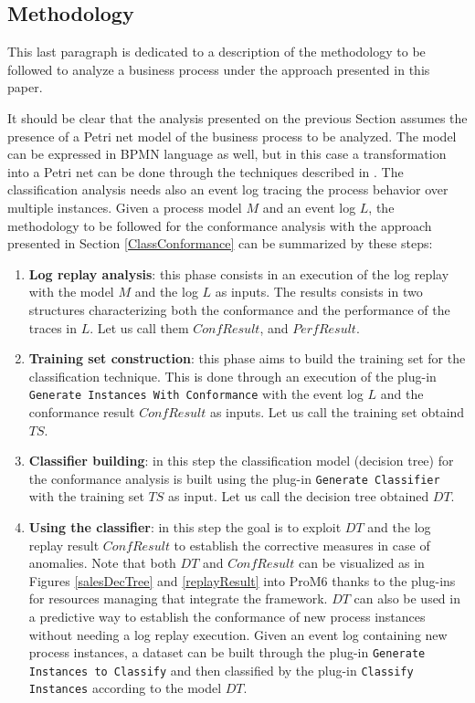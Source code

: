 \documentclass{llncs}
\begin{document}
\subsection{Methodology}
This last paragraph is dedicated to a description of the methodology to be followed to analyze a business process under the approach presented in this paper.

It should be clear that the analysis presented on the previous Section assumes the presence of a Petri net model of the business process to be analyzed. The model can be expressed in BPMN language as well, but in this case a transformation into a Petri net can be done through the techniques described in \cite{DBLP:conf/wsfm/BruniCFFGS11}. The classification analysis  needs also an event log tracing the process behavior over multiple instances. Given a process model $M$ and an event log $L$, the methodology to be followed for the conformance analysis with the approach presented in Section \ref{ClassConformance} can be summarized by these steps:
\begin{enumerate}

\item \label{step1} \textbf{Log replay analysis}: this phase consists in an execution of the log replay with  the model $M$ and the log $L$ as inputs. The results consists in two structures characterizing both the conformance and the performance of the traces in $L$. Let us call them $ConfResult$, and $PerfResult$.

\item \label{step2} \textbf{Training set construction}: this phase aims to build the training set for the classification technique. This is done through an execution of the plug-in \texttt{Generate Instances With Conformance} with the event log $L$ and the conformance result $ConfResult$ as inputs. Let us call the training set obtaind $TS$.

\item \textbf{Classifier building}: in this step the classification model (decision tree) for the conformance analysis is built using the plug-in \texttt{Generate Classifier} with the training set $TS$ as input. Let us call the decision tree obtained $DT$.

\item \textbf{Using the classifier}: in this step the goal is to exploit $DT$ and the log replay result $ConfResult$ to establish the corrective measures in case of anomalies. Note that both $DT$ and $ConfResult$ can be visualized as in Figures \ref{salesDecTree} and \ref{replayResult} into ProM6 thanks to the plug-ins for resources managing that integrate the framework. $DT$ can also be used in a predictive way to establish the conformance of new process instances without needing a log replay execution. Given an event log containing new process instances, a dataset can be built through the plug-in \texttt{Generate Instances to Classify} and then classified by the plug-in \texttt{Classify Instances} according to the model $DT$.
\end{enumerate}
\end{document}
